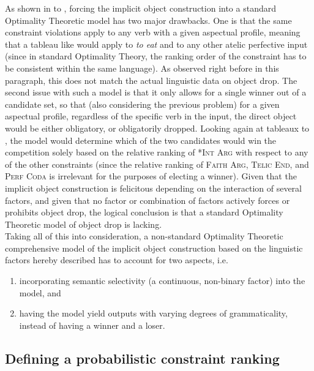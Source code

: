 As shown in  to , forcing the implicit object construction into a standard Optimality Theoretic model has two major drawbacks. One is that the same constraint violations apply to any verb with a given aspectual profile, meaning that a tableau like  would apply to \textit{to eat} and to any other atelic perfective input (since in standard Optimality Theory, the ranking order of the constraint has to be consistent within the same language). As observed right before in this paragraph, this does not match the actual linguistic data on object drop. The second issue with such a model is that it only allows for a single winner out of a candidate set, so that (also considering the previous problem) for a given aspectual profile, regardless of the specific verb in the input, the direct object would be either obligatory, or obligatorily dropped. Looking again at tableaux  to , the model would determine which of the two candidates would win the competition solely based on the relative ranking of \textsc{*Int Arg} with respect to any of the other constraints (since the relative ranking of \textsc{Faith Arg}, \textsc{Telic End}, and \textsc{Perf Coda} is irrelevant for the purposes of electing a winner). Given that the implicit object construction is felicitous depending on the interaction of several factors, and given that no factor or combination of factors actively forces or prohibits object drop, the logical conclusion is that a standard Optimality Theoretic model of object drop is lacking.\\
Taking all of this into consideration, a non-standard Optimality Theoretic comprehensive model of the implicit object construction based on the linguistic factors hereby described has to account for two aspects, i.e.
\begin{enumerate}
    \item incorporating semantic selectivity (a continuous, non-binary factor) into the model, and
    \item having the model yield outputs with varying degrees of grammaticality, instead of having a winner and a loser.
\end{enumerate}

\subsection{Defining a probabilistic constraint ranking} 
